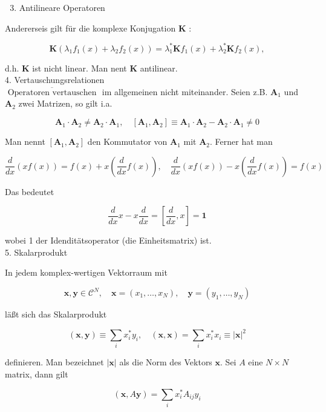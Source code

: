 \documentclass[10pt, letterpaper]{article}
\begin{document}
\begin{enumerate}
  \setcounter{enumi}{2}
  \item Antilineare Operatoren
\end{enumerate}

Andererseis gilt für die komplexe Konjugation $\mathbf{K}$ :

$$
\mathbf{K}\left(\lambda_{1} f_{1}(x)+\lambda_{2} f_{2}(x)\right)=\lambda_{1}^{*} \mathbf{K} f_{1}(x)+\lambda_{2}^{*} \mathbf{K} f_{2}(x),
$$

d.h. $\mathbf{K}$ ist nicht linear. Man nent $\mathbf{K}$ antilinear.\\
4. Vertauschungsrelationen\\
$\overline{\text { Operatoren vertauschen }}$ im allgemeinen nicht miteinander. Seien z.B. $\mathbf{A}_{1}$ und $\mathbf{A}_{2}$ zwei Matrizen, so gilt i.a.

$$
\mathbf{A}_{1} \cdot \mathbf{A}_{2} \neq \mathbf{A}_{2} \cdot \mathbf{A}_{1}, \quad\left[\mathbf{A}_{1}, \mathbf{A}_{2}\right] \equiv \mathbf{A}_{1} \cdot \mathbf{A}_{2}-\mathbf{A}_{2} \cdot \mathbf{A}_{1} \neq 0
$$

Man nennt $\left[\mathbf{A}_{1}, \mathbf{A}_{2}\right]$ den Kommutator von $\mathbf{A}_{1}$ mit $\mathbf{A}_{2}$. Ferner hat man

$$
\frac{d}{d x}(x f(x))=f(x)+x\left(\frac{d}{d x} f(x)\right), \quad \frac{d}{d x}(x f(x))-x\left(\frac{d}{d x} f(x)\right)=f(x)
$$

Das bedeutet

$$
\frac{d}{d x} x-x \frac{d}{d x}=\left[\frac{d}{d x}, x\right]=\mathbf{1}
$$

wobei 1 der Idenditätsoperator (die Einheitsmatrix) ist.\\
5. Skalarprodukt

In jedem komplex-wertigen Vektorraum mit

$$
\mathbf{x}, \mathbf{y} \in \mathcal{C}^{N}, \quad \mathbf{x}=\left(x_{1}, \ldots, x_{N}\right), \quad \mathbf{y}=\left(y_{1}, \ldots, y_{N}\right)
$$

läßt sich das Skalarprodukt

$$
(\mathbf{x}, \mathbf{y}) \equiv \sum_{i} x_{i}^{*} y_{i}, \quad(\mathbf{x}, \mathbf{x})=\sum_{i} x_{i}^{*} x_{i} \equiv|\mathbf{x}|^{2}
$$

definieren. Man bezeichnet $|\mathbf{x}|$ als die Norm des Vektors $\mathbf{x}$. Sei $A$ eine $N \times N$ matrix, dann gilt

$$
(\mathbf{x}, A \mathbf{y})=\sum_{i} x_{i}^{*} A_{i j} y_{i}
$$
\end{document}
